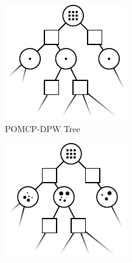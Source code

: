 \begin{figure}[htpb]
    \centering
    \begin{subfigure}[b]{0.45\columnwidth}
        \centering
        \includegraphics[width=\textwidth]{media/dpw_tree.pdf}
        \caption{POMCP-DPW Tree}
    \end{subfigure}
    \begin{subfigure}[b]{0.45\columnwidth}
        \centering
        \includegraphics[width=\textwidth]{media/pomcpow_tree.pdf}

\end{subfigure}
\end{figure}
